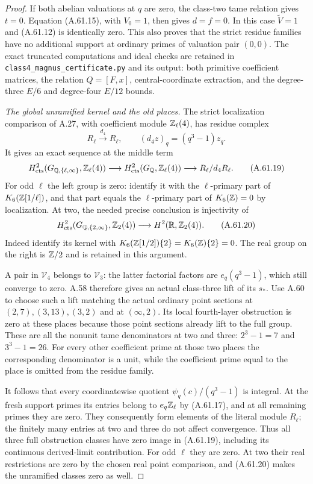 \begin{proof}
If both abelian valuations at $q$ are zero, the
class-two tame relation gives $t=0$.  Equation
(A.61.15), with $V_0=1$, then gives $d=f=0$.
In this case $\widetilde V=1$ and (A.61.12) is
identically zero.  This also proves that the
strict residue families have no additional support
at ordinary primes of valuation pair $(0,0)$.
The exact truncated computations and ideal checks are
retained in \texttt{class4\_magnus\_certificate.py}
and its output: both primitive coefficient matrices,
the relation $Q=[F,x]$, central-coordinate extraction,
and the degree-three $E/6$ and degree-four $E/12$ bounds.

\emph{The global unramified kernel and the old places.}
The strict localization comparison of A.27, with
coefficient module $\mathbb Z_\ell(4)$, has residue complex
\[
 R_\ell\xrightarrow{\ d_4\ }R_\ell,\qquad
                     (d_4z)_q=(q^3-1)z_q.
 \tag{A.61.18}
\]
It gives an exact sequence at the middle term
\[
 H^2_{\rm cts}(G_{\mathbb Q,\{\ell,\infty\}},\mathbb Z_\ell(4))
 \longrightarrow H^2_{\rm cts}(G_\mathbb Q,\mathbb Z_\ell(4))
 \longrightarrow R_\ell/d_4R_\ell.
 \tag{A.61.19}
\]
For odd $\ell$ the left group is zero:
\cite[VI, Theorem 8.2 and Examples 10.3]{Weibel2013}
identify it with the $\ell$-primary part of
$K_6(\mathbb Z[1/\ell])$, and that part equals the
$\ell$-primary part of $K_6(\mathbb Z)=0$ by localization.
At two, the needed precise conclusion is injectivity of
\[
 H^2_{\rm cts}(G_{\mathbb Q,\{2,\infty\}},\mathbb Z_2(4))
                \longrightarrow H^2(\mathbb R,\mathbb Z_2(4)).
 \tag{A.61.20}
\]
Indeed \cite[VI, Theorem 9.11, case $n=6$, and
Examples 10.3]{Weibel2013} identify its kernel with
$K_6(\mathbb Z[1/2])\{2\}=K_6(\mathbb Z)\{2\}=0$.
The real group on the right is $\mathbb Z/2$ and is retained
in this argument.

A pair in $\mathcal V_4$ belongs to $\mathcal V_3$:
the latter factorial factors are $e_q(q^3-1)$,
which still converge to zero.  A.58 therefore gives
an actual class-three lift of its $s_*$.
Use A.60 to choose such a lift matching the actual
ordinary point sections at $(2,7),(3,13),(3,2)$
and at $(\infty,2)$.  Its local fourth-layer
obstruction is zero at these places because those
point sections already lift to the full group.
These are all the nonunit tame denominators at two
and three: $2^3-1=7$ and $3^3-1=26$.
For every other coefficient prime at those two
places the corresponding denominator is a unit,
while the coefficient prime equal to the place is
omitted from the residue family.

It follows that every coordinatewise quotient
$\psi_q(c)/(q^3-1)$ is integral.  At the fresh support
primes its entries belong to $e_q\mathbb Z_\ell$ by
(A.61.17), and at all remaining primes they are
zero.  They consequently form elements of the
literal module $R_\ell$; the finitely many entries
at two and three do not affect convergence.
Thus all three full obstruction classes have zero
image in (A.61.19), including its continuous
derived-limit contribution.  For odd $\ell$ they
are zero.  At two their real restrictions are zero
by the chosen real point comparison, and (A.61.20)
makes the unramified classes zero as well.


\end{proof}
